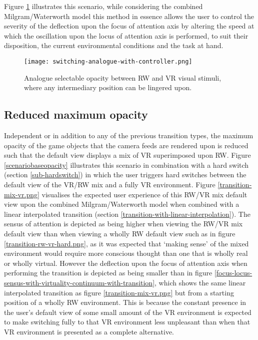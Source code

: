 Figure \ref{scenario2} illustrates this scenario, while considering the combined Milgram/Waterworth model this method in essence allows the user to control the severity of the deflection upon the focus of attention axis by altering the speed at which the oscillation upon the locus of attention axis is performed, to suit their disposition, the current environmental conditions and the task at hand.

\begin{figure}[h]
	\begin{center}
		\texttt{[image: switching-analogue-with-controller.png]}
		\caption{Analogue selectable opacity between RW and VR visual stimuli, where any intermediary position can be lingered upon.}
		\label{scenario2}
	\end{center}
\end{figure}




\subsection{Reduced maximum opacity}
\label{subsub-baseopacity}
Independent or in addition to any of the previous transition types, the maximum opacity of the game objects that the camera feeds are rendered upon is reduced such that the default view displays a mix of VR superimposed upon RW. Figure \ref{scenariobaseopacity} illustrates this scenario in combination with a hard switch (section \ref{sub-hardswitch}) in which the user triggers hard switches between the default view of the VR/RW mix and a fully VR environment. Figure \ref{transition-mix-vr.png} visualises the expected user experience of this RW/VR mix default view upon the combined Milgram/Waterworth model when combined with a linear interpolated transition (section \ref{transition-with-linear-interpolation}). The sensus of attention is depicted as being higher when viewing the RW/VR mix default view than when viewing a wholly RW default view such as in figure \ref{transition-rw-vr-hard.png}, as it was expected that `making sense' of the mixed environment would require more conscious thought than one that is wholly real or wholly virtual. However the deflection upon the focus of attention axis when performing the transition is depicted as being smaller than in figure \ref{focus-locus-sensus-with-virtuality-continuum-with-transition}, which shows the same linear interpolated transition as figure \ref{transition-mix-vr.png} but from a starting position of a wholly RW environment. This is because the constant presence in the user's default view of some small amount of the VR environment is expected to make switching fully to that VR environment less unpleasant than when that VR environment is presented as a complete alternative.

